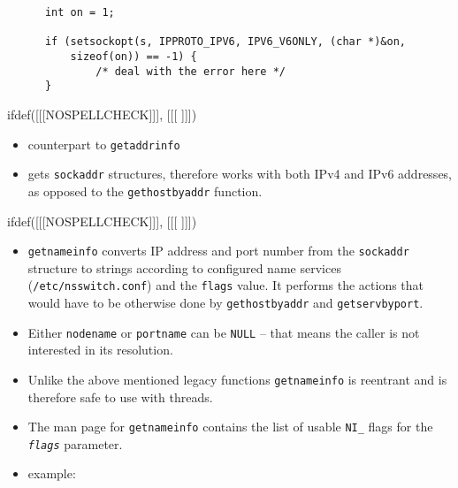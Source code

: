 \begin{itemize}
\begin{verbatim}
      int on = 1;

      if (setsockopt(s, IPPROTO_IPV6, IPV6_V6ONLY, (char *)&on,
          sizeof(on)) == -1) {
              /* deal with the error here */
      }
\end{verbatim}

\end{itemize}


ifdef([[[NOSPELLCHECK]]], [[[
]]])

\begin{slide}

\begin{itemize}
\item counterpart to \texttt{getaddrinfo}
\item gets \texttt{sockaddr} structures, therefore works with both
IPv4 and IPv6 addresses, as opposed to the \texttt{gethostbyaddr} function.
\end{itemize}
ifdef([[[NOSPELLCHECK]]], [[[
]]])
\end{slide}

\begin{itemize}
\item \texttt{getnameinfo} converts IP address and port number from the
\texttt{sockaddr} structure to strings according to configured name services
(\texttt{/etc/nsswitch.conf}) and the \texttt{flags} value.
It performs the actions that would have to be otherwise done by
\texttt{gethostbyaddr} and \texttt{getservbyport}.
\item Either \texttt{nodename} or \texttt{portname} can be \texttt{NULL} --
that means the caller is not interested in its resolution.
\item Unlike the above mentioned legacy functions \texttt{getnameinfo} is
reentrant and is therefore safe to use with threads.
\item The man page for \texttt{getnameinfo} contains the list of usable
\texttt{NI\_} flags for the \texttt{\emph{flags}} parameter.
\item {} example: 


\end{itemize}

